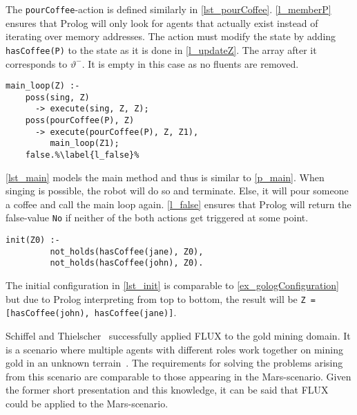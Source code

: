 The \texttt{pourCoffee}-action is defined similarly in \autoref{lst_pourCoffee}.
\autoref{l_memberP} ensures that Prolog will only look for agents that actually exist instead of iterating over memory addresses.
The action must modify the state by adding \texttt{hasCoffee(P)} to the state as it is done in \autoref{l_updateZ}.
The array after it corresponds to $\vartheta^-$.
It is empty in this case as no fluents are removed.
\begin{lstlisting}[firstnumber=10, caption={Main method which either tells the robot to sing or to pour coffee.}, label=lst_main]
  main_loop(Z) :-
    poss(sing, Z)
      -> execute(sing, Z, Z);
    poss(pourCoffee(P), Z)
      -> execute(pourCoffee(P), Z, Z1),
         main_loop(Z1);
    false.%\label{l_false}%
\end{lstlisting}
\autoref{lst_main} models the main method and thus is similar to \autoref{p_main}.
When singing is possible, the robot will do so and terminate.
Else, it will pour someone a coffee and call the main loop again.
\autoref{l_false} ensures that Prolog will return the false-value \texttt{No} if neither of the both actions get triggered at some point.
\begin{lstlisting}[firstnumber=17, caption={Initial configuration.}, label=lst_init]
  init(Z0) :-
         not_holds(hasCoffee(jane), Z0),
         not_holds(hasCoffee(john), Z0).
\end{lstlisting}
The initial configuration in \autoref{lst_init} is comparable to \autoref{ex_gologConfiguration} but due to Prolog interpreting from top to bottom, the result will be \texttt{Z = [hasCoffee(john), hasCoffee(jane)]}.

Schiffel and Thielscher~\cite{schiffel_multi-agent_2007} successfully applied FLUX to the gold mining domain.
It is a scenario where multiple agents with different roles work together on mining gold in an unknown terrain~\cite{schiffel_multi-agent_2007}.
The requirements for solving the problems arising from this scenario are comparable to those appearing in the Mars-scenario.
Given the former short presentation and this knowledge, it can be said that FLUX could be applied to the Mars-scenario.

